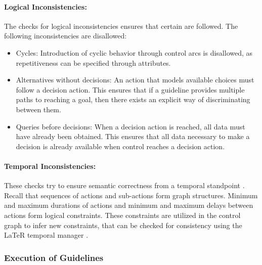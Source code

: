 \paragraph{Logical Inconsistencies:}

The checks for logical inconsistencies ensures that certain  are followed. The following inconsistencies are disallowed:

\begin{itemize}
  \item Cycles: Introduction of cyclic behavior through control arcs is
    disallowed, as repetitiveness can be specified through attributes.
  \item Alternatives without decisions: An action that models available choices
    must follow a decision action. This ensures that if a guideline provides
    multiple paths to reaching a goal, then there exists an explicit way of
    discriminating between them.
  \item Queries before decisions: When a decision action is reached, all
    data must have already been obtained. This ensures that all data
    necessary to make a decision is already available when control reaches
    a decision action.
\end{itemize}

\paragraph{Temporal Inconsistencies:}

These checks try to ensure semantic correctness from a temporal standpoint
\cite{TerenzianiAIM01}. Recall that sequences of actions and sub-actions form graph
structures. Minimum and maximum durations of actions and minimum and maximum delays
between actions form logical constraints. These constraints
are utilized in the control graph to infer new constraints, that can be checked
for consistency using the LaTeR temporal manager \cite{BrusoniExpert97,TerenzianiAIM01} .

\subsubsection{Execution of \GLARE{} Guidelines}\label{sec:glare}

